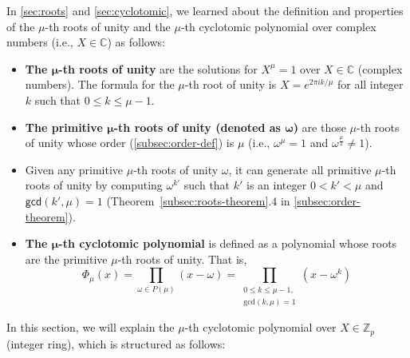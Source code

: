 
In \autoref{sec:roots} and \autoref{sec:cyclotomic}, we learned about the definition and properties of the $\mu$-th roots of unity and the $\mu$-th cyclotomic polynomial over complex numbers (i.e., $X \in \mathbb{C}$) as follows: 

\begin{itemize}
\item \textbf{The $\bm \mu$-th roots of unity} are the solutions for $X^\mu = 1$ over $X \in \mathbb{C}$ (complex numbers). The formula for the $\mu$-th root of unity is $X = e^{2 \pi i k / \mu}$ for all integer $k$ such that $0 \leq k \leq \mu - 1$. 
\item \textbf{The primitive $\bm \mu$-th roots of unity (denoted as $\bm \omega$)} are those $\mu$-th roots of unity whose order (\autoref{subsec:order-def}) is $\mu$ (i.e., $\omega^{\mu} = 1$ and $\omega^{\frac{\mu}{2}} \neq 1$). 
\item Given any primitive $\mu$-th roots of unity $\omega$, it can generate all primitive $\mu$-th roots of unity by computing $\omega^{k'}$ such that $k'$ is an integer $0 < k' < \mu$ and $\textsf{gcd}(k', \mu) = 1$ (Theorem~\ref*{subsec:roots-theorem}.4 in \autoref{subsec:order-theorem}). 
\item \textbf{The $\bm \mu$-th cyclotomic polynomial} is defined as a polynomial whose roots are the primitive $\mu$-th roots of unity. That is, \[ \Phi_{\mu}(x) = \prod_{\omega \in P({\mu})} (x - \omega) = \prod_{\substack{0 \leq k \leq {\mu}-1,\\ \text{gcd}(k, {\mu}) = 1}} (x - \omega^k) \]
\end{itemize}

In this section, we will explain the $\mu$-th cyclotomic polynomial over $X \in \mathbb{Z}_p$ (integer ring), which is structured as follows: 


